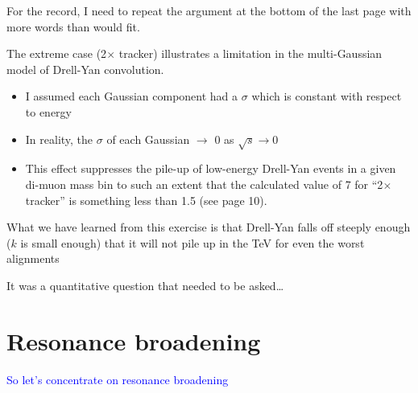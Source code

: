 \documentclass[compress]{beamer}
\begin{document}
\begin{notes}
\item For the record, I need to repeat the argument at the bottom of
the last page with more words than would fit.
\item The extreme case (2$\times$ tracker) illustrates a limitation in
the multi-Gaussian model of Drell-Yan convolution.
\begin{itemize}
\item I assumed each Gaussian component had a $\sigma$ which is
constant with respect to energy
\item In reality, the $\sigma$ of each Gaussian $\to$ 0 as $\sqrt{s} \to 0$
\item This effect suppresses the pile-up of low-energy Drell-Yan
events in a given di-muon mass bin to such an extent that the
calculated value of 7 for ``2$\times$ tracker'' is something less than
1.5 (see page 10).
\end{itemize}
\item What we have learned from this exercise is that Drell-Yan falls
off steeply enough ($k$ is small enough) that it will not pile up in
the TeV for even the worst alignments
\item It was a quantitative question that needed to be asked\ldots
\end{notes}

\section*{Resonance broadening}

\begin{frame}
\begin{center}
\Huge \textcolor{blue}{So let's concentrate on resonance broadening}
\end{center}
\end{frame}
\end{document}
